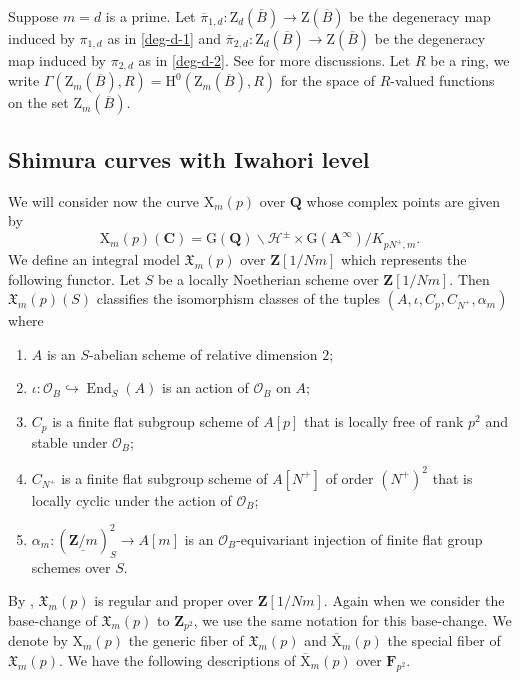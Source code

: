 \documentclass[10pt]{amsart}
\newcommand*\Z{\mathds{Z}}
\newcommand*\ZZ{|[draw,circle]| \Z_2}
\numberwithin{equation}{section}
\theoremstyle{plain}
\numberwithin{equation}{section}
\theoremstyle{definition}
\theoremstyle{remark}
\def\interX{\mathfrak{X}}
\DeclareMathOperator{\End}{End}
\def\calH{\mathcal{H}}
\def\calO{\mathcal{O}}
\def\Adel{\mathbf{A}}
\def\CC{\mathbf{C}}
\def\FF{\mathbf{F}}
\def\QQ{\mathbf{Q}}
\def\ZZ{\mathbf{Z}}
\def\rmG{\mathrm{G}}
\def\rmH{\mathrm{H}}
\def\rmX{\mathrm{X}}
\def\rmZ{\mathrm{Z}}
\begin{document}
Suppose $m=d$ is a prime. Let $\overline{\pi}_{1,d}:\rmZ_{d}(\overline{B})\rightarrow \rmZ(\overline{B})$ be the degeneracy map induced by $\pi_{1, d}$ as in \ref{deg-d-1} and $\overline{\pi}_{2,d}:\rmZ_{d}(\overline{B})\rightarrow \rmZ(\overline{B})$ be the degeneracy map induced by $\pi_{2, d}$ as in \ref{deg-d-2}. See \cite[A.1.2]{Liu-cubic} for more discussions.
Let $R$ be a ring, we write $\Gamma(\rmZ_{m}(\overline{B}), R)=\rmH^{0}(\rmZ_{m}(\overline{B}), R)$ for the space of $R$-valued functions on the set $\rmZ_{m}(\overline{B})$. 

\subsection{Shimura curves with Iwahori level}
We will consider now the curve $\rmX_{m}(p)$ over $\QQ$ whose complex points are given by
\begin{equation*}
\rmX_{m}(p)(\CC)=\rmG(\QQ)\backslash \calH^{\pm} \times \rmG(\Adel^{\infty})/K_{pN^{+},m}.
\end{equation*}
We define an integral model $\interX_{m}(p)$ over $\ZZ[1/Nm]$ which represents the following functor.  Let $S$ be a locally Noetherian scheme over $\ZZ[1/Nm]$. Then $\interX_{m}(p)(S)$ classifies the isomorphism classes of the tuples $(A, \iota, C_{p}, C_{N^{+}}, \alpha_{m})$ where
\begin{enumerate}
\item $A$ is an $S$-abelian scheme of relative dimension $2$;
\item $\iota: \calO_{B}\hookrightarrow \End_{S}(A)$ is an action of $\calO_{B}$ on $A$;
\item $C_{p}$ is a finite flat subgroup scheme of $A[p]$ that is locally free of rank $p^{2}$ and stable under $\calO_{B}$;
\item $C_{N^{+}}$ is a finite flat subgroup scheme of $A[N^{+}]$ of order $(N^{+})^{2}$ that is locally cyclic under the action of $\calO_{B}$;
\item $\alpha_{m}: (\underline{\ZZ/m})^{2}_{S}\rightarrow A[m]$ is an $\calO_{B}$-equivariant injection of finite flat group schemes over $S$.
\end{enumerate}
By \cite[Theorem 4.7]{Buzzard}, $\interX_{m}(p)$ is regular and proper over $\ZZ[1/Nm]$. Again when we consider the base-change of $\interX_{m}(p)$ to $\ZZ_{p^{2}}$, we use the same notation for this base-change. We denote by $\rmX_{m}(p)$ the generic fiber of $\interX_{m}(p)$ and $\overline{\rmX}_{m}(p)$ the special fiber of $\interX_{m}(p)$. We have the following descriptions of $\overline{\rmX}_{m}(p)$ over $\FF_{p^{2}}$. 
\end{document}
